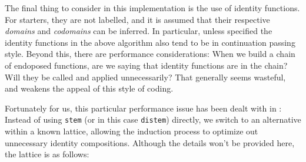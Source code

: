 \documentclass[twoside]{article}
\begin{document}
The final thing to consider in this implementation is the use of identity functions. For starters, they are not labelled,
and it is assumed that their respective \emph{domains} and \emph{codomains} can be inferred. In particular, unless specified
the identity functions in the above algorithm also tend to be in continuation passing style. Beyond this, there are performance
considerations: When we build a chain of endoposed functions, are we saying that identity functions are in the chain? Will
they be called and applied unnecessarily? That generally seems wasteful, and weakens the appeal of this style of coding.

Fortunately for us, this particular performance issue has been dealt with in \cite{nikfi}: Instead of using \texttt{stem}
(or in this case \texttt{distem}) directly, we switch to an alternative within a known lattice, allowing the induction
process to optimize out unnecessary identity compositions. Although the details won't be provided here, the lattice
is as follows:
\end{document}
